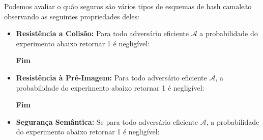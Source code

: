 \documentclass[a4paper]{article}
\begin{document}
Podemos avaliar o quão seguros são vários tipos de esquemas de hash
camaleão observando as seguintes propriedades deles:

\begin{itemize}
\item\textbf{Resistência a Colisão: }Para todo adversário eficiente
  $\mathcal{A}$ a probabilidade do experimento abaixo retornar 1 é
  negligível:

  \noindent
  \begin{algorithm}[H]
    \SetAlgoLined
     \textbf{Fim}
  \end{algorithm}
  
\item\textbf{Resistência à Pré-Imagem: }Para todo adversário eficiente
  $\mathcal{A}$, a probabilidade do experimento abaixo retornar 1 é
  negligível:

  \noindent
  \begin{algorithm}[H]
    \SetAlgoLined
     
    \textbf{Fim}
  \end{algorithm}

\item\textbf{Segurança Semântica: }Se para todo adversário eficiente
  $\mathcal{A}$, a probabilidade do experimento abaixo retornar 1 é
  negligível:

  \noindent
  \begin{algorithm}[H]
    \SetAlgoLined
     
  \end{algorithm}


\end{itemize}
\end{document}
